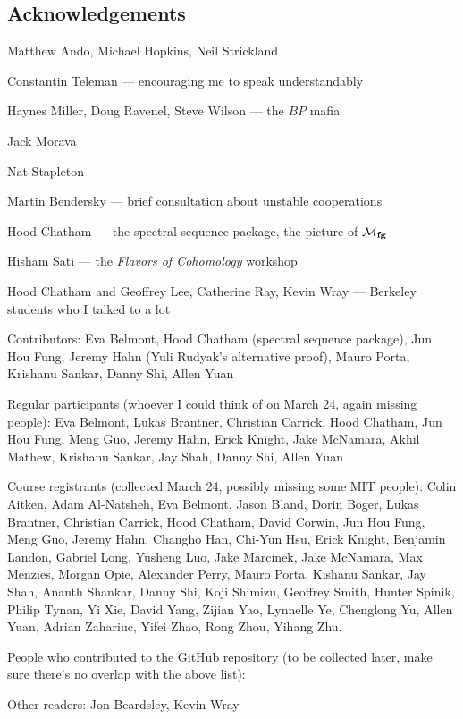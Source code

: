 


\newpage

\subsection*{Acknowledgements}

Matthew Ando, Michael Hopkins, Neil Strickland

Constantin Teleman --- encouraging me to speak understandably

Haynes Miller, Doug Ravenel, Steve Wilson --- the $BP$ mafia

Jack Morava

Nat Stapleton

Martin Bendersky --- brief consultation about unstable cooperations

Hood Chatham --- the spectral sequence package, the picture of $\mathcal{M}_{\mathbf{fg}}$

Hisham Sati --- the \textit{Flavors of Cohomology} workshop

Hood Chatham and Geoffrey Lee, Catherine Ray, Kevin Wray --- Berkeley students who I talked to a lot





Contributors: Eva Belmont, Hood Chatham (spectral sequence package), Jun Hou Fung, Jeremy Hahn (Yuli Rudyak's alternative proof), Mauro Porta, Krishanu Sankar, Danny Shi, Allen Yuan

Regular participants (whoever I could think of on March 24, again missing people): Eva Belmont, Lukas Brantner, Christian Carrick, Hood Chatham, Jun Hou Fung, Meng Guo, Jeremy Hahn, Erick Knight, Jake McNamara, Akhil Mathew, Krishanu Sankar, Jay Shah, Danny Shi, Allen Yuan

Course registrants (collected March 24, possibly missing some MIT people): Colin Aitken, Adam Al-Natsheh, Eva Belmont, Jason Bland, Dorin Boger, Lukas Brantner, Christian Carrick, Hood Chatham, David Corwin, Jun Hou Fung, Meng Guo, Jeremy Hahn, Changho Han, Chi-Yun Hsu, Erick Knight, Benjamin Landon, Gabriel Long, Yusheng Luo, Jake Marcinek, Jake McNamara, Max Menzies, Morgan Opie, Alexander Perry, Mauro Porta, Kishanu Sankar, Jay Shah, Ananth Shankar, Danny Shi, Koji Shimizu, Geoffrey Smith, Hunter Spinik, Philip Tynan, Yi Xie, David Yang, Zijian Yao, Lynnelle Ye, Chenglong Yu, Allen Yuan, Adrian Zahariuc, Yifei Zhao, Rong Zhou, Yihang Zhu.

People who contributed to the GitHub repository (to be collected later, make sure there's no overlap with the above list): 

Other readers: Jon Beardsley, Kevin Wray

